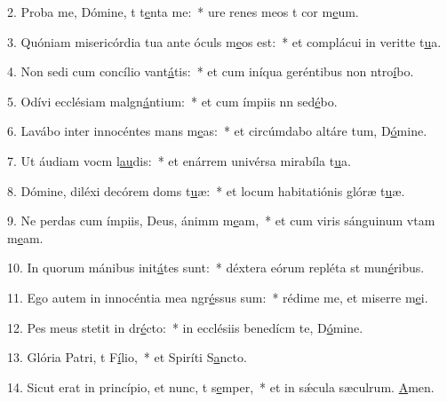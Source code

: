 2. Proba me, Dómine, t t\uline{e}nta me:~* ure renes meos t cor m\uline{e}um.\par 
3. Quóniam misericórdia tua ante óculs m\uline{e}os est:~* et complácui in veritte t\uline{u}a.\par 
4. Non sedi cum concílio vant\uline{á}tis:~* et cum iníqua geréntibus non ntro\uline{í}bo.\par 
5. Odívi ecclésiam malgn\uline{á}ntium:~* et cum ímpiis nn sed\uline{é}bo.\par 
6. Lavábo inter innocéntes mans m\uline{e}as:~* et circúmdabo altáre tum, D\uline{ó}mine.\par 
7. Ut áudiam vocm l\uline{au}dis:~* et enárrem univérsa mirabíla t\uline{u}a.\par 
8. Dómine, diléxi decórem doms t\uline{u}æ:~* et locum habitatiónis glóræ t\uline{u}æ.\par 
9. Ne perdas cum ímpiis, Deus, ánimm m\uline{e}am,~* et cum viris sánguinum vtam m\uline{e}am.\par 
10. In quorum mánibus init\uline{á}tes sunt:~* déxtera eórum repléta st mun\uline{é}ribus.\par 
11. Ego autem in innocéntia mea ngr\uline{é}ssus sum:~* rédime me, et miserre m\uline{e}i.\par 
12. Pes meus stetit in dr\uline{é}cto:~* in ecclésiis benedícm te, D\uline{ó}mine.\par 
13. Glória Patri, t F\uline{í}lio,~* et Spiríti S\uline{a}ncto.\par 
14. Sicut erat in princípio, et nunc, t s\uline{e}mper,~* et in sǽcula sæculrum. \uline{A}men.\par 
